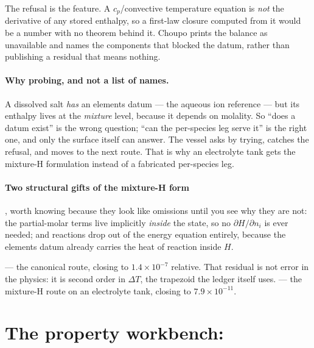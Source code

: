 \documentclass[11pt,a4paper]{article}
\begin{document}
\begin{keyidea}
The refusal is the feature.  A $c_p$/convective temperature equation is
\emph{not} the derivative of any stored enthalpy, so a first-law closure
computed from it would be a number with no theorem behind it.  Choupo
prints the balance as unavailable and names the components that blocked
the datum, rather than publishing a residual that means nothing.
\end{keyidea}

\paragraph{Why probing, and not a list of names.}  A dissolved salt
\emph{has} an elements datum --- the aqueous ion reference --- but its
enthalpy lives at the \emph{mixture} level, because it depends on
molality.  So ``does a datum exist'' is the wrong question; ``can the
per-species leg serve it'' is the right one, and only the surface itself
can answer.  The vessel asks by trying, catches the refusal, and moves to
the next route.  That is why an electrolyte tank gets the mixture-H
formulation instead of a fabricated per-species leg.

\paragraph{Two structural gifts of the mixture-H form}, worth knowing
because they look like omissions until you see why they are not: the
partial-molar terms live implicitly \emph{inside} the state, so no
$\partial H/\partial n_i$ is ever needed; and reactions drop out of the
energy equation entirely, because the elements datum already carries the
heat of reaction inside $H$.

\begin{tutoriallink}
 --- the canonical route, closing to
$1.4\times 10^{-7}$ relative.  That residual is not error in the physics:
it is second order in $\Delta T$, the trapezoid the ledger itself uses.
 --- the mixture-H route on an
electrolyte tank, closing to $7.9\times 10^{-11}$.
\end{tutoriallink}

\section{The property workbench: }\label{sec:props}
\end{document}
